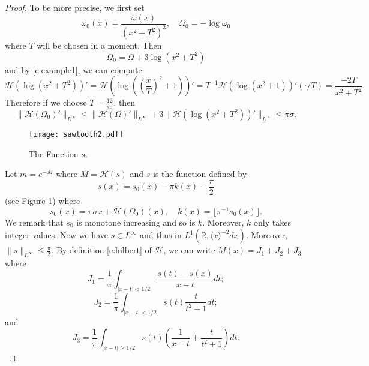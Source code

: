\documentclass[reqno,12pt,letterpaper]{amsart}
\numberwithin{equation}{section}
\numberwithin{prop}{section}
\begin{document}
\begin{proof}
To be more precise, we first set 
\begin{equation*}
\omega_0(x)=\frac{\omega(x)}{(x^2+T^2)^3}, \quad \Omega_0=-\log\omega_0
\end{equation*}
where $T$ will be chosen in a moment. Then
\begin{equation*}
\Omega_0=\Omega+3\log(x^2+T^2)
\end{equation*}
and by \eqref{e:example1}, we can compute
\begin{equation*}
\mathcal{H}(\log(x^2+T^2))'=\mathcal{H}(\log((\frac{x}{T})^2+1))'
=T^{-1}\mathcal{H}(\log(x^2+1))'(\cdot/T)=\frac{-2T}{x^2+T^2}.
\end{equation*}
Therefore if we choose $T=\frac{12}{\pi\sigma}$, then
\begin{equation}
\label{e:hilbert-bd2}
\|\mathcal{H}(\Omega_0)'\|_{L^\infty}\leq\|\mathcal{H}(\Omega)'\|_{L^\infty}
+3\|\mathcal{H}(\log(x^2+T^2))'\|_{L^\infty}\leq \pi\sigma.
\end{equation}

\begin{figure}
\centering
\texttt{[image: sawtooth2.pdf]}
\caption{The Function $s$.}
\label{f:sawtooth2}
\end{figure}

Let $m=e^{-M}$ where $M=\mathcal{H}(s)$ and $s$ is the function defined by
\begin{equation*}
s(x)=s_0(x)-\pi k(x)-\frac{\pi}{2}
\end{equation*}
(see Figure \ref{f:sawtooth2}) where
\begin{equation*}
s_0(x)=\pi\sigma x+\mathcal{H}(\Omega_0)(x),
\quad
k(x)=\lfloor\pi^{-1}s_0(x)\rfloor.
\end{equation*}
We remark that $s_0$ is monotone increasing and so is $k$. Moreover, $k$ only takes integer values. Now we have $s\in L^\infty$ and thus in $L^1(\mathbb{R},\langle x\rangle^{-2}dx)$. Moreover, $\|s\|_{L^\infty}\leq\frac{\pi}{2}$. By definition \eqref{e:hilbert}
of $\mathcal{H}$, we can write $M(x)=J_1+J_2+J_3$ where
\begin{equation*}
J_1=\frac{1}{\pi}\int_{|x-t|<1/2}\frac{s(t)-s(x)}{x-t}dt;
\end{equation*}
\begin{equation*}
J_2=\frac{1}{\pi}\int_{|x-t|<1/2}s(t)\frac{t}{t^2+1}dt;
\end{equation*}
and
\begin{equation*}
J_3=\frac{1}{\pi}\int_{|x-t|\geq1/2}s(t)\left(\frac{1}{x-t}+\frac{t}{t^2+1}\right)dt.
\end{equation*}


\end{proof}
\end{document}
